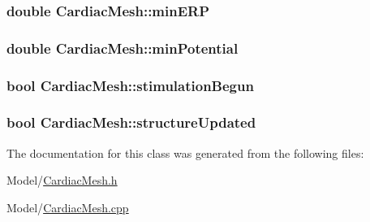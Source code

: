 \hypertarget{class_cardiac_mesh_a4aae36cc4fd814771864c32d52d24480}{
\subsubsection[{min\+E\+R\+P}]{\setlength{\rightskip}{0pt plus 5cm}double Cardiac\+Mesh\+::min\+E\+R\+P}}\label{class_cardiac_mesh_a4aae36cc4fd814771864c32d52d24480}
\hypertarget{class_cardiac_mesh_af4837ac47dd1c8f12b400a0ca7c1c94f}{
\subsubsection[{min\+Potential}]{\setlength{\rightskip}{0pt plus 5cm}double Cardiac\+Mesh\+::min\+Potential}}\label{class_cardiac_mesh_af4837ac47dd1c8f12b400a0ca7c1c94f}
\hypertarget{class_cardiac_mesh_ac14b1f228c8426e067df4a925824348e}{
\subsubsection[{stimulation\+Begun}]{\setlength{\rightskip}{0pt plus 5cm}bool Cardiac\+Mesh\+::stimulation\+Begun}}\label{class_cardiac_mesh_ac14b1f228c8426e067df4a925824348e}
\hypertarget{class_cardiac_mesh_aa23210cc3b7de35c82ebbcde43e053c2}{
\subsubsection[{structure\+Updated}]{\setlength{\rightskip}{0pt plus 5cm}bool Cardiac\+Mesh\+::structure\+Updated}}\label{class_cardiac_mesh_aa23210cc3b7de35c82ebbcde43e053c2}


The documentation for this class was generated from the following files\+:\begin{DoxyCompactItemize}
\item 
Model/\hyperlink{_cardiac_mesh_8h}{Cardiac\+Mesh.\+h}\item 
Model/\hyperlink{_cardiac_mesh_8cpp}{Cardiac\+Mesh.\+cpp}\end{DoxyCompactItemize}
